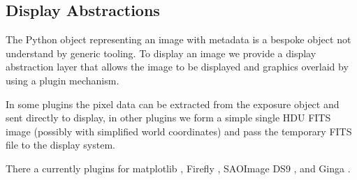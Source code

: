 \subsection{Display Abstractions}
\label{sec:display}

The Python object representing an image with metadata is a bespoke object not understand by generic tooling.
To display an image we provide a display abstraction layer that allows the image to be displayed and graphics overlaid by using a plugin mechanism.

In some plugins the pixel data can be extracted from the exposure object and sent directly to display, in other plugins we form a simple single HDU FITS image (possibly with simplified world coordinates) and pass the temporary FITS file to the display system.

There a currently plugins for matplotlib \citep{2007CSE.....9...90H}, Firefly \citep{2020ASPC..527..243R}, SAOImage DS9 \citep{2003ASPC..295..489J}, and Ginga \citep[][via Astrowidgets]{2013ASPC..475..319J}.
